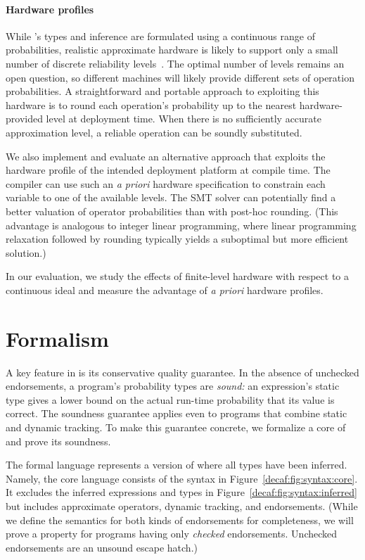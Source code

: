 \paragraph{Hardware profiles}

While \lang's types and inference are formulated using a continuous range of
probabilities, realistic approximate hardware is likely to support only a
small number of discrete reliability levels~\cite{truffle, quora}.
The optimal number of levels remains an open question, so different machines
will likely provide different sets of operation probabilities.
A straightforward and portable approach to exploiting this hardware is to
round each operation's probability up to the nearest hardware-provided level
at deployment time.
When there is no sufficiently accurate approximation level, a reliable
operation can be soundly substituted.

We also implement and evaluate an alternative approach that exploits the
hardware profile of the intended deployment platform at compile time.
The compiler can use such an \emph{a priori} hardware specification to
constrain each variable to one of the available levels.
The SMT solver can potentially find a better valuation of operator
probabilities than with post-hoc rounding.
(This advantage is analogous to integer linear programming, where linear
programming relaxation followed by rounding typically yields a suboptimal but
more efficient solution.)

In our evaluation, we study the effects of finite-level hardware with respect
to a continuous ideal and measure the advantage of \emph{a priori} hardware
profiles.


\section{Formalism}
\label{decaf:sec:semantics}

A key feature in \lang is its conservative quality guarantee.
In the absence of unchecked endorsements, a \lang program's probability types
are \emph{sound:} an expression's static type gives a lower bound on the actual
run-time probability that its value is correct.
The soundness guarantee applies
even to programs that combine static and dynamic tracking.
To make this guarantee concrete, we formalize a core of \lang and prove its
soundness.

The formal language represents a version of \lang where all types have been
inferred.
Namely, the core language consists of the syntax in
Figure~\ref{decaf:fig:syntax:core}.
It excludes the inferred expressions and types in
Figure~\ref{decaf:fig:syntax:inferred} but
includes approximate operators, dynamic tracking, and endorsements.
(While we define the semantics for both kinds of endorsements for
completeness, we will prove a property for programs having only \emph{checked}
endorsements. Unchecked endorsements are an unsound escape hatch.)

